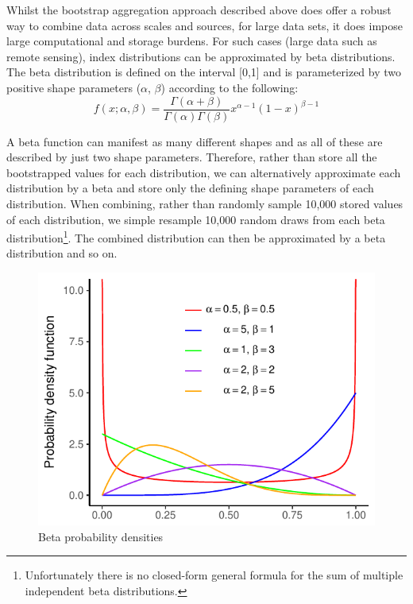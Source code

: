 Whilst the bootstrap aggregation approach described above does offer a robust way to combine data
across scales and sources, for large data sets, it does impose large computational and storage
burdens.  For such cases (large data such as remote sensing), index distributions can be
approximated by beta distributions.  The beta distribution is defined on the interval [0,1] and is
parameterized by two positive shape parameters ($\alpha$, $\beta$) according to the following:
$$
f(x;\alpha, \beta) = \frac{\Gamma(\alpha +
\beta)}{\Gamma(\alpha)\Gamma(\beta)}x^{\alpha-1}(1-x)^{\beta-1}
$$

A beta function can manifest as many different shapes and as all of these are described by just two
shape parameters.  Therefore, rather than store all the bootstrapped values for each distribution,
we can alternatively approximate each distribution by a beta and store only the defining shape
parameters of each distribution.  When combining, rather than randomly sample 10,000 stored values
of each distribution, we simple resample 10,000 random draws from each beta
distribution\footnote{Unfortunately there is no closed-form general formula for the sum of multiple
independent beta distributions.}.  The combined distribution can then be approximated by a beta
distribution and so on.

\begin{figure}[ht]
\begin{center}\includegraphics{figures/Diagrams/beta.pdf}\end{center}
\caption{Beta probability densities}\label{fig:beta}
\end{figure}

